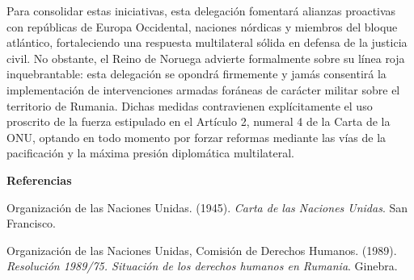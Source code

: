 \documentclass[11pt,a4paper]{article}
\begin{document}
Para consolidar estas iniciativas, esta delegación fomentará alianzas proactivas con repúblicas de Europa Occidental, naciones nórdicas y miembros del bloque atlántico, fortaleciendo una respuesta multilateral sólida en defensa de la justicia civil. No obstante, el Reino de Noruega advierte formalmente sobre su línea roja inquebrantable: esta delegación se opondrá firmemente y jamás consentirá la implementación de intervenciones armadas foráneas de carácter militar sobre el territorio de Rumania. Dichas medidas contravienen explícitamente el uso proscrito de la fuerza estipulado en el Artículo 2, numeral 4 de la Carta de la ONU, optando en todo momento por forzar reformas mediante las vías de la pacificación y la máxima presión diplomática multilateral.

\vspace{1cm}
\begin{center}
    \textbf{Referencias}
\end{center}
\begin{description}
    \item Organización de las Naciones Unidas. (1945). \textit{Carta de las Naciones Unidas}. San Francisco.
    \item Organización de las Naciones Unidas, Comisión de Derechos Humanos. (1989). \textit{Resolución 1989/75. Situación de los derechos humanos en Rumania}. Ginebra.
\end{description}
\end{document}
